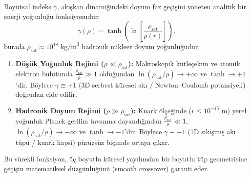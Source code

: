 \documentclass[11pt,a4paper]{article}
\begin{document}
Boyutsal indeks $\gamma$, akışkan dinamiğindeki doyum faz geçişini yöneten analitik bir enerji yoğunluğu fonksiyonudur:
\begin{equation}
    \gamma(\rho) = \tanh\left( \ln\left[ \frac{\rho_{\mathrm{sat}}}{\rho(r)} \right] \right),
    \label{eq:gamma_surekli_gecis_paper3}
\end{equation}
burada $\rho_{\mathrm{sat}} \approx 10^{18}\text{ kg/m}^3$ hadronik nükleer doyum yoğunluğudur.
\begin{enumerate}
    \item \textbf{Düşük Yoğunluk Rejimi ($\rho \ll \rho_{\mathrm{sat}}$):} Makroskopik kütleçekim ve atomik elektron bulutunda $\frac{\rho_{\mathrm{sat}}}{\rho} \gg 1$ olduğundan $\ln(\rho_{\mathrm{sat}}/\rho) \to +\infty$ ve $\tanh \to +1$'dir. Böylece $\gamma \equiv +1$ (3D serbest küresel akı / Newton--Coulomb potansiyeli) doğrudan elde edilir.
    \item \textbf{Hadronik Doyum Rejimi ($\rho \gg \rho_{\mathrm{sat}}$):} Kuark ölçeğinde ($r \le 10^{-15}\text{ m}$) yerel yoğunluk Planck gerilim tavanına dayandığından $\frac{\rho_{\mathrm{sat}}}{\rho} \ll 1$, $\ln(\rho_{\mathrm{sat}}/\rho) \to -\infty$ ve $\tanh \to -1$'dir. Böylece $\gamma \equiv -1$ (1D sıkışmış akı tüpü / kuark hapsi) pürüzsüz biçimde ortaya çıkar.
\end{enumerate}
Bu sürekli fonksiyon, üç boyutlu küresel yayılımdan bir boyutlu tüp geometrisine geçişin matematiksel düzgünlüğünü (smooth crossover) garanti eder.
\end{document}
